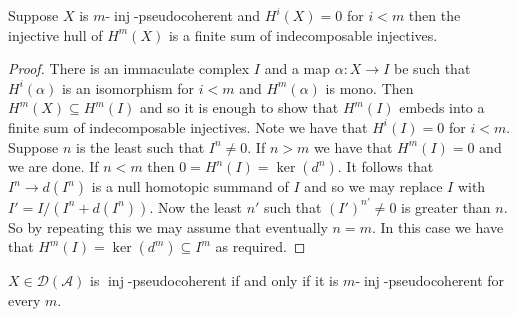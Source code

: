 \documentclass[12pt,oneside]{amsart}
\DeclareMathOperator{\inj}{inj}
\begin{document}
\begin{lemma} \label{injfinlemma}
Suppose $X$ is $m$-$\inj$-pseudocoherent and $H^i(X) = 0$ for $i < m$ then the injective hull of $H^m(X)$ is a finite sum of indecomposable injectives.
\end{lemma}

\begin{proof}
There is an immaculate complex $I$ and a map $\alpha: X \to I$ be such that $H^i(\alpha)$ is an isomorphism for $i < m$ and $H^m(\alpha)$ is mono. Then $H^m(X) \subseteq H^m(I)$ and so it is enough to show that $H^m(I)$ embeds into a finite sum of indecomposable injectives. Note we have that $H^i(I) = 0$ for $i < m$. Suppose $n$ is the least such that $I^n \neq 0$. If $ n > m$ we have that $H^m(I) = 0$ and we are done. If $n < m$ then $0 = H^n(I) = \ker(d^n)$. It follows that $I^n \to d(I^n)$ is a null homotopic summand of $I$ and so we may replace $I$ with $I'= I/(I^n + d(I^n))$. Now the least $n'$ such that $(I')^{n'} \neq 0$ is greater than $n$. So by repeating this we may assume that eventually $n = m$. In this case we have that $H^m(I) = \ker(d^m) \subseteq I^m$ as required.  
\end{proof}


\begin{lemma} \label{injfinchar}
$X \in \mathcal{D}(\mathcal{A})$ is $\inj$-pseudocoherent if and only if it is $m$-$\inj$-pseudocoherent for every $m$.
\end{lemma}
\end{document}
